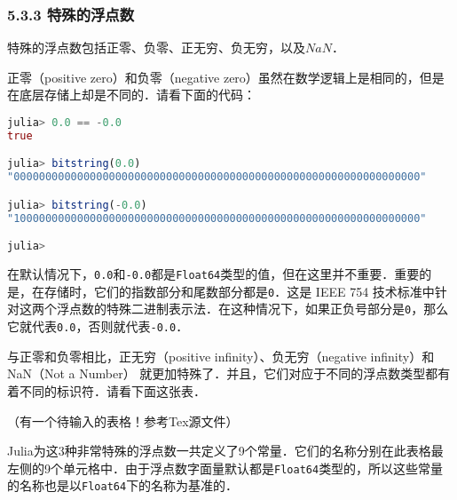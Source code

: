 \subsubsection{5.3.3 特殊的浮点数}

特殊的浮点数包括正零、负零、正无穷、负无穷，以及$NaN$．

正零（positive zero）和负零（negative zero）虽然在数学逻辑上是相同的，但是在底层存储上却是不同的．请看下面的代码：
\begin{lstlisting}[language=julia]
julia> 0.0 == -0.0 
true

julia> bitstring(0.0)
"0000000000000000000000000000000000000000000000000000000000000000"

julia> bitstring(-0.0)
"1000000000000000000000000000000000000000000000000000000000000000"

julia> 
\end{lstlisting}

在默认情况下，\verb|0.0|和\verb|-0.0|都是\verb|Float64|类型的值，但在这里并不重要．重要的是，在存储时，它们的指数部分和尾数部分都是\verb|0|．这是 IEEE 754 技术标准中针对这两个浮点数的特殊二进制表示法．在这种情况下，如果正负号部分是\verb|0|，那么它就代表\verb|0.0|，否则就代表\verb|-0.0|．

与正零和负零相比，正无穷（positive infinity）、负无穷（negative infinity）和 NaN（Not a Number） 就更加特殊了．并且，它们对应于不同的浮点数类型都有着不同的标识符．请看下面这张表．

（有一个待输入的表格！参考Tex源文件）


Julia为这3种非常特殊的浮点数一共定义了9个常量．它们的名称分别在此表格最左侧的9个单元格中．由于浮点数字面量默认都是\verb|Float64|类型的，所以这些常量的名称也是以\verb|Float64|下的名称为基准的．

